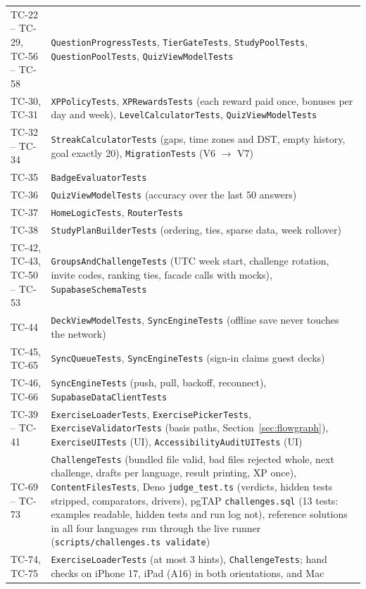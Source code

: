 \documentclass[12pt,letterpaper]{article}
\begin{document}
\begin{xltabular}{\textwidth}{@{}L{2.4cm} Y@{}}
TC-22 -- TC-29, TC-56 -- TC-58 & \texttt{QuestionProgressTests}, \texttt{TierGateTests}, \texttt{StudyPoolTests}, \texttt{QuestionPoolTests}, \texttt{QuizViewModelTests} \\
TC-30, TC-31 & \texttt{XPPolicyTests}, \texttt{XPRewardsTests} (each reward paid once, bonuses per day and week), \texttt{LevelCalculatorTests}, \texttt{QuizViewModelTests} \\
TC-32 -- TC-34 & \texttt{StreakCalculatorTests} (gaps, time zones and DST, empty history, goal exactly 20), \texttt{MigrationTests} (V6 $\to$ V7) \\
TC-35 & \texttt{BadgeEvaluatorTests} \\
TC-36 & \texttt{QuizViewModelTests} (accuracy over the last 50 answers) \\
TC-37 & \texttt{HomeLogicTests}, \texttt{RouterTests} \\
TC-38 & \texttt{StudyPlanBuilderTests} (ordering, ties, sparse data, week rollover) \\
TC-42, TC-43, TC-50 -- TC-53 & \texttt{GroupsAndChallengeTests} (UTC week start, challenge rotation, invite codes, ranking ties, facade calls with mocks), \texttt{SupabaseSchemaTests} \\
TC-44 & \texttt{DeckViewModelTests}, \texttt{SyncEngineTests} (offline save never touches the network) \\
TC-45, TC-65 & \texttt{SyncQueueTests}, \texttt{SyncEngineTests} (sign-in claims guest decks) \\
TC-46, TC-66 & \texttt{SyncEngineTests} (push, pull, backoff, reconnect), \texttt{SupabaseDataClientTests} \\
TC-39 -- TC-41 & \texttt{ExerciseLoaderTests}, \texttt{ExercisePickerTests}, \texttt{ExerciseValidatorTests} (basis paths, Section~\ref{sec:flowgraph}), \texttt{ExerciseUITests} (UI), \texttt{AccessibilityAuditUITests} (UI) \\
TC-69 -- TC-73 & \texttt{ChallengeTests} (bundled file valid, bad files rejected whole, next challenge, drafts per language, result printing, XP once), \texttt{ContentFilesTests}, Deno \texttt{judge\_test.ts} (verdicts, hidden tests stripped, comparators, drivers), pgTAP \texttt{challenges.sql} (13 tests: examples readable, hidden tests and run log not), reference solutions in all four languages run through the live runner (\texttt{scripts/challenges.ts validate}) \\
TC-74, TC-75 & \texttt{ExerciseLoaderTests} (at most 3 hints), \texttt{ChallengeTests}; hand checks on iPhone 17, iPad (A16) in both orientations, and Mac \\

\end{xltabular}
\end{document}
